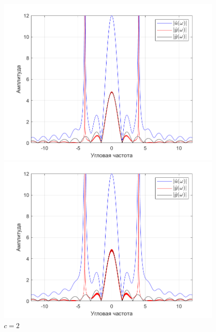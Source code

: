 \documentclass[a4paper]{article}
\begin{document}
\begin{figure}[H]
    \begin{minipage}{0.5\textwidth}
        \centering
        \includegraphics[width=\linewidth]{ex1_2/приближение/a1=0_a2=25_b1=10.5_b2=25_d=4_c=1/h4.png}
        \caption{$c=1$}
    \end{minipage}
    \begin{minipage}{0.5\textwidth}
        \centering
        \includegraphics[width=\linewidth]{ex1_2/приближение/a1=0_a2=25_b1=10.5_b2=25_d=4_c=2/h4.png}
        \caption{$c=2$}
    \end{minipage}
\end{figure}
\end{document}
